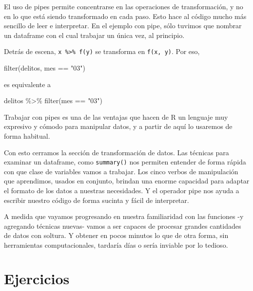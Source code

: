 \documentclass[
]{book}
\newenvironment{Shaded}{\begin{snugshade}}{\end{snugshade}}
\newcommand{\FunctionTok}[1]{\textcolor[rgb]{0.00,0.00,0.00}{#1}}
\newcommand{\NormalTok}[1]{#1}
\newcommand{\SpecialCharTok}[1]{\textcolor[rgb]{0.00,0.00,0.00}{#1}}
\newcommand{\StringTok}[1]{\textcolor[rgb]{0.31,0.60,0.02}{#1}}
\begin{document}
El uso de pipes permite concentrarse en las operaciones de transformación, y no en lo que está siendo transformado en cada paso. Esto hace al código mucho más sencillo de leer e interpretar. En el ejemplo con pipe, sólo tuvimos que nombrar un dataframe con el cual trabajar un única vez, al principio.

Detrás de escena, \texttt{x\ \%\textgreater{}\%\ f(y)} se transforma en \texttt{f(x,\ y)}. Por eso,

\begin{Shaded}
\begin{Highlighting}[]
\FunctionTok{filter}\NormalTok{(delitos, mes }\SpecialCharTok{==} \StringTok{"03"}\NormalTok{)}
\end{Highlighting}
\end{Shaded}

es equivalente a

\begin{Shaded}
\begin{Highlighting}[]
\NormalTok{delitos }\SpecialCharTok{\%\textgreater{}\%} \FunctionTok{filter}\NormalTok{(mes }\SpecialCharTok{==} \StringTok{"03"}\NormalTok{)}
\end{Highlighting}
\end{Shaded}

Trabajar con pipes es una de las ventajas que hacen de R un lenguaje muy expresivo y cómodo para manipular datos, y a partir de aquí lo usaremos de forma habitual.

Con esto cerramos la sección de transformación de datos. Las técnicas para examinar un dataframe, como \texttt{summary()} nos permiten entender de forma rápida con que clase de variables vamos a trabajar. Los cinco verbos de manipulación que aprendimos, usados en conjunto, brindan una enorme capacidad para adaptar el formato de los datos a nuestras necesidades. Y el operador pipe nos ayuda a escribir nuestro código de forma sucinta y fácil de interpretar.

A medida que vayamos progresando en nuestra familiaridad con las funciones -y agregando técnicas nuevas- vamos a ser capaces de procesar grandes cantidades de datos con soltura. Y obtener en pocos minutos lo que de otra forma, sin herramientas computacionales, tardaría días o sería inviable por lo tedioso.

\hypertarget{ejercicios-1}{%
\section{Ejercicios}\label{ejercicios-1}}
\end{document}
